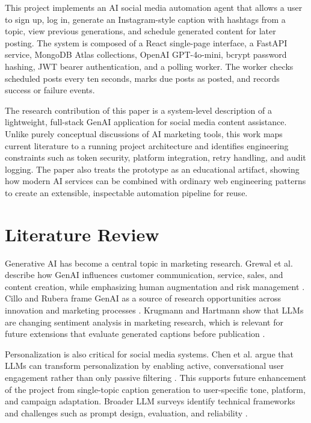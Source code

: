 \documentclass[conference]{IEEEtran}
\begin{document}
This project implements an AI social media automation agent that allows a user to sign up, log in, generate an Instagram-style caption with hashtags from a topic, view previous generations, and schedule generated content for later posting. The system is composed of a React single-page interface, a FastAPI service, MongoDB Atlas collections, OpenAI GPT-4o-mini, bcrypt password hashing, JWT bearer authentication, and a polling worker. The worker checks scheduled posts every ten seconds, marks due posts as posted, and records success or failure events.

The research contribution of this paper is a system-level description of a lightweight, full-stack GenAI application for social media content assistance. Unlike purely conceptual discussions of AI marketing tools, this work maps current literature to a running project architecture and identifies engineering constraints such as token security, platform integration, retry handling, and audit logging. The paper also treats the prototype as an educational artifact, showing how modern AI services can be combined with ordinary web engineering patterns to create an extensible, inspectable automation pipeline for reuse.

\section{Literature Review}

Generative AI has become a central topic in marketing research. Grewal et al. describe how GenAI influences customer communication, service, sales, and content creation, while emphasizing human augmentation and risk management \cite{grewal2025}. Cillo and Rubera frame GenAI as a source of research opportunities across innovation and marketing processes \cite{cillo2025}. Krugmann and Hartmann show that LLMs are changing sentiment analysis in marketing research, which is relevant for future extensions that evaluate generated captions before publication \cite{krugmann2024}.

Personalization is also critical for social media systems. Chen et al. argue that LLMs can transform personalization by enabling active, conversational user engagement rather than only passive filtering \cite{chen2024}. This supports future enhancement of the project from single-topic caption generation to user-specific tone, platform, and campaign adaptation. Broader LLM surveys identify technical frameworks and challenges such as prompt design, evaluation, and reliability \cite{kumar2024llm}.
\end{document}
